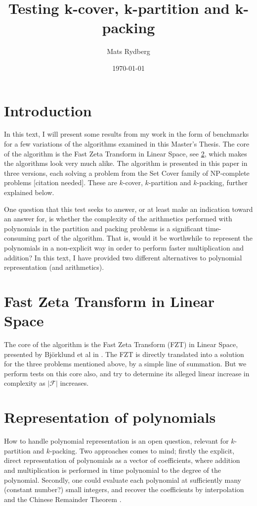 \documentclass[a4paper, titlepage]{article}
\title{\huge{Testing k-cover, k-partition and k-packing}}
\author{Mats Rydberg}
\date{\today}
\begin{document}
\maketitle

\section{Introduction}
In this text, I will present some results from my work in the form of benchmarks for a few variations of the algorithms examined in this Master's Thesis. The core of the algorithm is the Fast Zeta Transform in Linear Space, see \ref{fztlin}, which makes the algorithms look very much alike. The algorithm is presented in this paper in three versions, each solving a problem from the Set Cover family of NP-complete problems [citation needed]. These are $k$-cover, $k$-partition and $k$-packing, further explained below.

One question that this test seeks to answer, or at least make an indication toward an answer for, is whether the complexity of the arithmetics performed with polynomials in the partition and packing problems is a significant time-consuming part of the algorithm. That is, would it be worthwhile to represent the polynomials in a non-explicit way in order to perform faster multiplication and addition? In this text, I have provided two different alternatives to polynomial representation (and arithmetics).

\section{Fast Zeta Transform in Linear Space} \label{fztlin}
The core of the algorithm is the Fast Zeta Transform (FZT) in Linear Space, presented by Björklund et al in \cite{cov_pack}. The FZT is directly translated into a solution for the three problems mentioned above, by a simple line of summation. But we perform tests on this core also, and try to determine its alleged linear increase in complexity as $|\mathcal{F}|$ increases.

\section{Representation of polynomials}
How to handle polynomial representation is an open question, relevant for $k$-partition and $k$-packing. Two approaches comes to mind; firstly the explicit, direct representation of polynomials as a vector of coefficients, where addition and multiplication is performed in time polynomial to the degree of the polynomial. Secondly, one could evaluate each polynomial at sufficiently many (constant number?) small integers, and recover the coefficients by interpolation and the Chinese Remainder Theorem \cite{CRT}.
\end{document}
